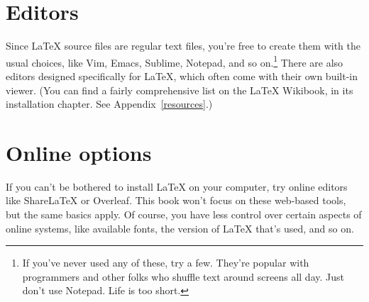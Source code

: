 \section{Editors}

Since \LaTeX{} source files are regular text files,
you're free to create them with the usual choices, like Vim, Emacs,
Sublime, Notepad\plusplus, and so on.\punckern\footnote{If you've never used
any of these, try a few.
They're popular with programmers and other folks who shuffle text around
screens all day. Just don't use Notepad. Life is too short.}
There are also editors designed specifically for \LaTeX{},
which often come with their own built-in  viewer.
(You can find a fairly comprehensive list on the \LaTeX{} Wikibook,
in its installation chapter. See Appendix~\ref{resources}.)

\section{Online options}

If you can't be bothered to install \LaTeX{} on your computer,
try online editors like Share\LaTeX{} or Overleaf.
This book won't focus on these web-based tools,
but the same basics apply.
Of course, you have less control over certain aspects of online systems,
like available fonts, the version of \LaTeX{} that's used, and so on.
